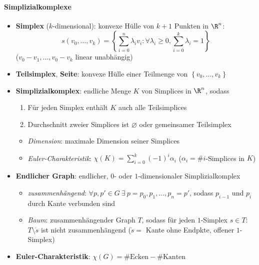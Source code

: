 \paragraph{Simplizialkomplexe}
\begin{itemize}
  \item \textbf{Simplex} (\( k \)-dimensional): konvexe Hülle von \( k+1 \) Punkten in \( \R^n \):
  \begin{equation*}
    s(v_0,\dots,v_k) = \left \{ \sum_{i=0}^n \lambda_i v_i : \forall \lambda_i \geq 0, \sum_{i=0}^k \lambda_i = 1 \right \}
  \end{equation*}
  (\( v_0-v_1, \dots, v_0-v_k \) linear unabhängig)
  \item \textbf{Teilsimplex}, \textbf{Seite}: konvexe Hülle einer Teilmenge von \( \left \{ v_0,\dots,v_k \right \} \)
  \item \textbf{Simplizialkomplex}: endliche Menge \( K \) von Simplices in \( \R^n \), sodass
  \begin{enumerate}
    \item Für jeden Simplex enthält \( K \) auch alle Teilsimplices
    \item Durchschnitt zweier Simplices ist \( \varnothing \) oder gemeinsamer Teilsimplex
  \end{enumerate}
  \begin{itemize}
    \item \emph{Dimension}: maximale Dimension seiner Simplices
    \item \emph{Euler-Charakteristik}: \( \chi(K) = \sum_{i=0}^k {(-1)}^i \alpha_i \) (\( \alpha_i = \# i \)-Simplices in \( K \))
  \end{itemize}
  \item \textbf{Endlicher Graph}: endlicher, \( 0 \)- oder \( 1 \)-dimensionaler Simplizialkomplex
  \begin{itemize}
    \item \emph{zusammenhängend}: \( \forall p, p' \in G \ \exists \ p = p_0,p_1,\dots,p_n = p' \), sodass \( p_{i-1} \) und \( p_i \) durch Kante verbunden sind
    \item \emph{Baum}: zusammenhängender Graph \( T \), sodass für jeden \( 1 \)-Simplex \( s \in T \): \( T \setminus \mathring{s} \) ist nicht zusammenhängend (\( \mathring{s} = \) Kante ohne Endpkte, offener \( 1 \)-Simplex)
  \end{itemize}
  \item \textbf{Euler-Charakteristik}: \( \chi(G) = \# \text{Ecken} - \# \text{Kanten} \)
  \begin{itemize}

\end{itemize}
\end{itemize}
